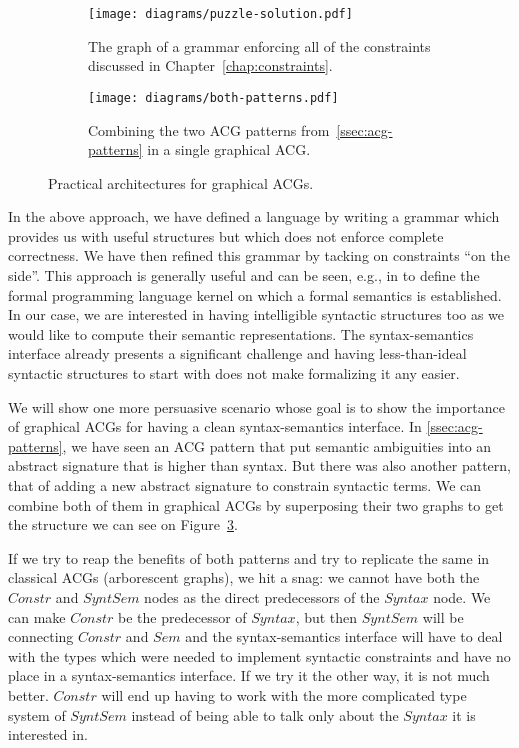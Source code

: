 \begin{figure}[t]
  \centering
  \begin{subfigure}[b]{0.4\textwidth}
    \centering
    \texttt{[image: diagrams/puzzle-solution.pdf]}
    \caption{{\label{fig:puzzle-solution} The graph of a grammar
        enforcing all of the constraints discussed in
        Chapter~\ref{chap:constraints}.}}
  \end{subfigure}
  \qquad
  \begin{subfigure}[b]{0.4\textwidth}
    \centering
    \texttt{[image: diagrams/both-patterns.pdf]}
    \caption{{\label{fig:both-patterns} Combining the two ACG patterns
        from~\ref{ssec:acg-patterns} in a single graphical ACG.}}
  \end{subfigure}
  \caption{Practical architectures for graphical ACGs.}
\end{figure}

In the above approach, we have defined a language by writing a grammar
which provides us with useful structures but which does not enforce
complete correctness. We have then refined this grammar by tacking on
constraints ``on the side''. This approach is generally useful and can
be seen, e.g., in \cite{van2004concepts} to define the formal
programming language kernel on which a formal semantics is
established. In our case, we are interested in having intelligible
syntactic structures too as we would like to compute their semantic
representations. The syntax-semantics interface already presents a
significant challenge and having less-than-ideal syntactic structures to
start with does not make formalizing it any easier.

We will show one more persuasive scenario whose goal is to show the
importance of graphical ACGs for having a clean syntax-semantics
interface. In \ref{ssec:acg-patterns}, we have seen an ACG pattern that
put semantic ambiguities into an abstract signature that is higher than
syntax. But there was also another pattern, that of adding a new
abstract signature to constrain syntactic terms. We can combine both of
them in graphical ACGs by superposing their two graphs to get the
structure we can see on Figure~\ref{fig:both-patterns}.

If we try to reap the benefits of both patterns and try to replicate the
same in classical ACGs (arborescent graphs), we hit a snag: we cannot
have both the $Constr$ and $SyntSem$ nodes as the direct predecessors of
the $Syntax$ node. We can make $Constr$ be the predecessor of $Syntax$,
but then $SyntSem$ will be connecting $Constr$ and $Sem$ and the
syntax-semantics interface will have to deal with the types which were
needed to implement syntactic constraints and have no place in a
syntax-semantics interface. If we try it the other way, it is not much
better. $Constr$ will end up having to work with the more complicated
type system of $SyntSem$ instead of being able to talk only about the
$Syntax$ it is interested in.

